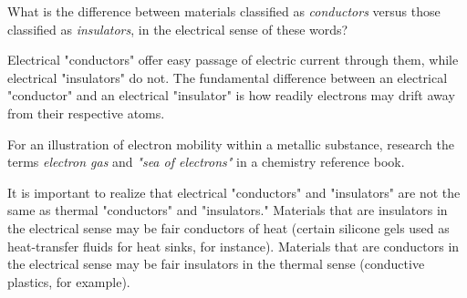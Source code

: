 

What is the difference between materials classified as {\it conductors} versus those classified as {\it insulators}, in the electrical sense of these words?







Electrical "conductors" offer easy passage of electric current through them, while electrical "insulators" do not.  The fundamental difference between an electrical "conductor" and an electrical "insulator" is how readily electrons may drift away from their respective atoms.

For an illustration of electron mobility within a metallic substance, research the terms {\it electron gas} and {\it "sea of electrons"} in a chemistry reference book.







It is important to realize that electrical "conductors" and "insulators" are not the same as thermal "conductors" and "insulators."  Materials that are insulators in the electrical sense may be fair conductors of heat (certain silicone gels used as heat-transfer fluids for heat sinks, for instance).  Materials that are conductors in the electrical sense may be fair insulators in the thermal sense (conductive plastics, for example).




